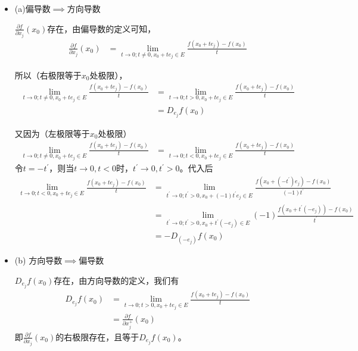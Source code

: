\documentclass{article}
\begin{document}
\begin{itemize}
  \item (a)偏导数$\implies$方向导数

        $\frac{\partial f}{\partial x_j}(x_0)$存在，由偏导数的定义可知，
        \begin{align*}
          \frac{\partial f}{\partial x_j}(x_0)
           & = \lim\limits_{t \to 0; t \neq 0, x_0 + te_j \in E} \frac{f(x_0 + te_j) - f(x_0)}{t}
        \end{align*}

        所以（右极限等于$x_0$处极限），
        \begin{align*}
          \lim\limits_{t \to 0; t \neq 0, x_0 + te_j \in E} \frac{f(x_0 + te_j) - f(x_0)}{t}
           & = \lim\limits_{t \to 0; t > 0, x_0 + te_j \in E} \frac{f(x_0 + te_j) - f(x_0)}{t} \\
           & = D_{e_j}f(x_0)
        \end{align*}

        又因为（左极限等于$x_0$处极限）
        \begin{align*}
          \lim\limits_{t \to 0; t \neq 0, x_0 + te_j \in E} \frac{f(x_0 + te_j) - f(x_0)}{t}
           & = \lim\limits_{t \to 0; t < 0, x_0 + te_j \in E} \frac{f(x_0 + te_j) - f(x_0)}{t}
        \end{align*}
        令$t = - t^\prime$，则当$t \to 0, t < 0$时，$t^\prime \to 0, t^\prime > 0$。代入后
        \begin{align*}
          \lim\limits_{t \to 0; t < 0, x_0 + te_j \in E} \frac{f(x_0 + te_j) - f(x_0)}{t}
           & = \lim\limits_{t^\prime \to 0; t^\prime > 0, x_0 + (-1)t^\prime e_j \in E} \frac{f(x_0 + (-t^\prime)e_j) - f(x_0)}{(-1)t^\prime} \\
           & = \lim\limits_{t^\prime \to 0; t^\prime > 0, x_0 + t^\prime (-e_j) \in E} (-1) \frac{f(x_0 + t^\prime(-e_j)) - f(x_0)}{t^\prime} \\
           & = - D_{(-e_j)} f(x_0)
        \end{align*}

  \item (b) 方向导数$\implies$偏导数

        $D_{e_j}f(x_0)$存在，由方向导数的定义，我们有
        \begin{align*}
          D_{e_j}f(x_0) & = \lim\limits_{t \to 0; t > 0, x_0 + t e_j \in E} \frac{f(x_0 + t e_j) - f(x_0)}{t} \\
                        & = \frac{\partial f}{\partial x_j^+}(x_0)
        \end{align*}
        即$\frac{\partial f}{\partial x_j}(x_0)$的右极限存在，且等于$D_{e_j}f(x_0)$。


\end{itemize}
\end{document}

